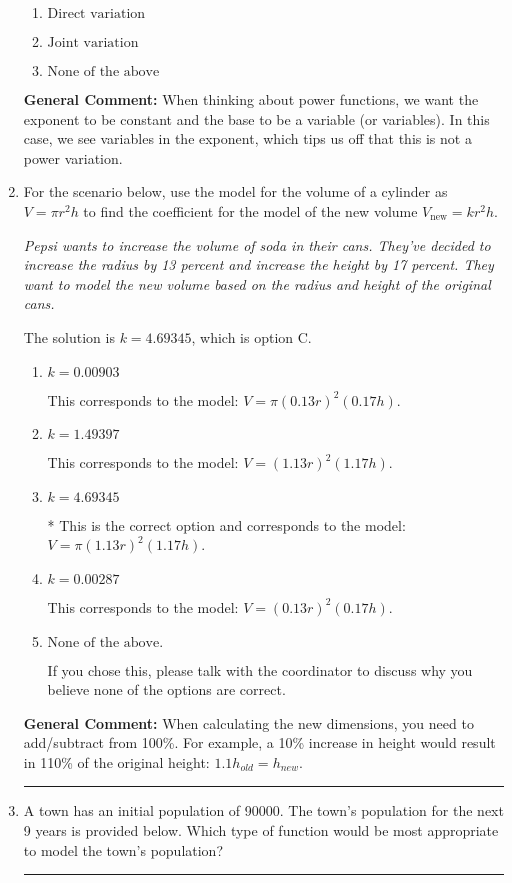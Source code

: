 \documentclass{extbook}[14pt]
\newcommand{\litem}[1]{\item #1

\rule{\textwidth}{0.4pt}}
\begin{document}
\begin{enumerate}
{\begin{enumerate}[label=\Alph*.]
\item \( \text{Direct variation} \)


\item \( \text{Joint variation} \)


\item \( \text{None of the above} \)


\end{enumerate}

\textbf{General Comment:} When thinking about power functions, we want the exponent to be constant and the base to be a variable (or variables). In this case, we see variables in the exponent, which tips us off that this is not a power variation.
}
\litem{
For the scenario below, use the model for the volume of a cylinder as $V = \pi r^2 h$ to find the coefficient for the model of the new volume $V_{\text{new}} = k r^2 h$.

\begin{center}
    \textit{ Pepsi wants to increase the volume of soda in their cans. They've decided to increase the radius by 13 percent and increase the height by 17 percent. They want to model the new volume based on the radius and height of the original cans. }
\end{center}
The solution is \( k = 4.69345 \), which is option C.\begin{enumerate}[label=\Alph*.]
\item \( k = 0.00903 \)

This corresponds to the model: $V = \pi (0.13 r)^2 (0.17 h)$.
\item \( k = 1.49397 \)

This corresponds to the model: $V = (1.13 r)^2 (1.17 h)$.
\item \( k = 4.69345 \)

* This is the correct option and corresponds to the model: $V = \pi (1.13 r)^2 (1.17 h)$.
\item \( k = 0.00287 \)

This corresponds to the model: $V = (0.13 r)^2 (0.17 h)$.
\item \( \text{None of the above.} \)

If you chose this, please talk with the coordinator to discuss why you believe none of the options are correct.
\end{enumerate}

\textbf{General Comment:} When calculating the new dimensions, you need to add/subtract from 100\%. For example, a 10\% increase in height would result in 110\% of the original height: $1.1h_{old} = h_{new}$.
}
\litem{
A town has an initial population of 90000. The town's population for the next 9 years is provided below. Which type of function would be most appropriate to model the town's population?


}
\end{enumerate}
\end{document}

